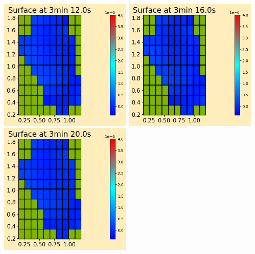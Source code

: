 \documentclass[11pt]{article}
\begin{document}
\vskip 10pt 
\includegraphics[width=0.475\textwidth]{frame0048fig0.png}
\vskip 10pt 
\includegraphics[width=0.475\textwidth]{frame0049fig0.png}
\vskip 10pt 
\includegraphics[width=0.475\textwidth]{frame0050fig0.png}
\end{document}
